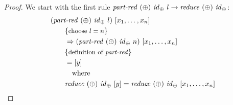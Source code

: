 \begin{proof}
  We start with the first rule $\text{\textit{part-red}}\ (\oplus)\ \text{\textit{id}}_\oplus\ l \rightarrow \text{\textit{reduce}}\ (\oplus)\ \text{\textit{id}}_\oplus$:
  \begin{align*}
    &(\partRed\ (\oplus)\ \id_\oplus\ l)\ [x_1, \ldots, x_n]\\
    &\qquad \comment{choose $l=n$}\\
    &\qquad \Rightarrow (\partRed\ (\oplus)\ \id_\oplus\ n)\ [x_1, \ldots, x_n]\\
    &\qquad \comment{definition of \partRed}\\
    &\qquad = [y]\\
    &\qquad\quad \text{where}\\
    &\qquad \reduce\ (\oplus)\ \id_\oplus\ [y] = \reduce\ (\oplus)\ \id_\oplus\ [x_1, \ldots, x_n]
  \end{align*}
\end{proof}
